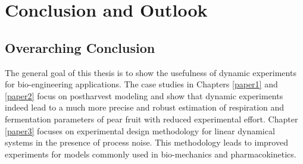 \chapter{Conclusion and Outlook}
\label{conclusion}
\section{Overarching Conclusion}
The general goal of this thesis is to show the usefulness of dynamic experiments for {\color{red}bio-engineering} applications. The case studies in Chapters \ref{paper1} and \ref{paper2} {\color{red}focus on postharvest modeling and} show that dynamic experiments indeed lead to a much more precise {\color{red}and robust} estimation of respiration and fermentation parameters of pear fruit with reduced experimental effort. {\color{red} Chapter \ref{paper3} focuses on experimental design methodology for linear dynamical systems in the presence of process noise. This methodology leads to improved experiments for models commonly used in bio-mechanics and pharmacokinetics.}
	
